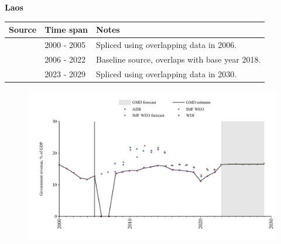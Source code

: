 \documentclass[12pt,a4paper,landscape]{article}
\begin{document}
\begin{adjustbox}{max totalsize={\paperwidth}{\paperheight},center}
\begin{minipage}[t][\textheight][t]{\textwidth}
\vspace*{0.5cm}
{}
\begin{center}
{\Large\bfseries Laos}
\end{center}
\vspace{0.5cm}
\begin{table}[H]
\centering
\small
\begin{tabular}{|l|l|l|}
\hline
\textbf{Source} & \textbf{Time span} & \textbf{Notes} \\
\hline
\rowcolor{white}\cite{IMF_WEO}& 2000 - 2005 &Spliced using overlapping data in 2006.\\
\rowcolor{lightgray}\cite{WDI}& 2006 - 2022 &Baseline source, overlaps with base year 2018.\\
\rowcolor{white}\cite{IMF_WEO_forecast}& 2023 - 2029 &Spliced using overlapping data in 2030.\\
\hline
\end{tabular}
\end{table}
\begin{figure}[H]
\centering
\includegraphics[width=\textwidth,height=0.6\textheight,keepaspectratio]{graphs/LAO_govrev_GDP.pdf}
\end{figure}
\end{minipage}
\end{adjustbox}
\end{document}
